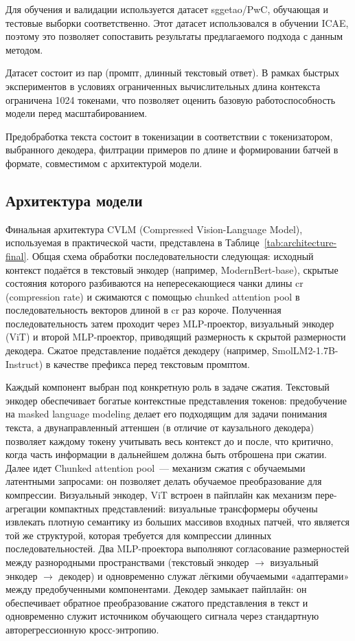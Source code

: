 \documentclass[a4paper,12pt]{extarticle}
\begin{document}
Для обучения и валидации используется датасет sggetao/PwC, обучающая и тестовые выборки соответственно. Этот датасет использовался в обучении ICAE, поэтому это позволяет сопоставить результаты предлагаемого подхода с данным методом.

Датасет состоит из пар (промпт, длинный текстовый ответ). В рамках быстрых экспериментов в условиях ограниченных вычислительных длина контекста ограничена 1024 токенами, что позволяет оценить базовую работоспособность модели перед масштабированием.

Предобработка текста состоит в токенизации в соответствии с токенизатором, выбранного декодера, филтрации примеров по длине и формировании батчей в формате, совместимом с архитектурой модели.

\subsection{Архитектура модели}

Финальная архитектура CVLM (Compressed Vision-Language Model), используемая в практической части, представлена в Таблице~\ref{tab:architecture-final}. Общая схема обработки последовательности следующая: исходный контекст подаётся в текстовый энкодер (например, ModernBert-base), скрытые состояния которого разбиваются на непересекающиеся чанки длины $\text{cr}$ (compression rate) и сжимаются с помощью chunked attention pool в последовательность векторов длиной в $\text{cr}$ раз короче. Полученная последовательность затем проходит через MLP-проектор, визуальный энкодер (ViT) и второй MLP-проектор, приводящий размерность к скрытой размерности декодера. Сжатое представление подаётся декодеру (например, SmolLM2-1.7B-Instruct) в качестве префикса перед текстовым промптом.

Каждый компонент выбран под конкретную роль в задаче сжатия. Текстовый энкодер обеспечивает богатые контекстные представления токенов: предобучение на masked language modeling делает его подходящим для задачи понимания текста, а двунаправленный аттеншен (в отличие от каузального декодера) позволяет каждому токену учитывать весь контекст до и после, что критично, когда часть информации в дальнейшем должна быть отброшена при сжатии. Далее идет Chunked attention pool~--- механизм сжатия с обучаемыми латентными запросами: он позволяет делать обучаемое преобразование для компрессии. Визуальный энкодер, ViT встроен в пайплайн как механизм пере-агрегации компактных представлений: визуальные трансформеры обучены извлекать плотную семантику из больших массивов входных патчей, что является той же структурой, которая требуется для компрессии длинных последовательностей. Два MLP-проектора выполняют согласование размерностей между разнородными пространствами (текстовый энкодер $\to$ визуальный энкодер $\to$ декодер) и одновременно служат лёгкими обучаемыми «адаптерами» между предобученными компонентами. Декодер замыкает пайплайн: он обеспечивает обратное преобразование сжатого представления в текст и одновременно служит источником обучающего сигнала через стандартную авторегрессионную кросс-энтропию.
\end{document}
